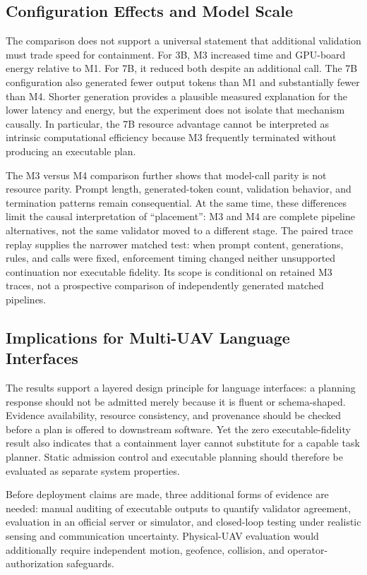 \documentclass[conference]{IEEEtran}
\newcommand{\Mone}{\textsc{M1}\xspace}
\newcommand{\Mthree}{\textsc{M3}\xspace}
\newcommand{\Mfour}{\textsc{M4}\xspace}
\begin{document}
\subsection{Configuration Effects and Model Scale}

The comparison does not support a universal statement that additional
validation must trade speed for containment. For 3B, \Mthree increased time
and GPU-board energy relative to \Mone. For 7B, it reduced both despite an
additional call. The 7B configuration also generated fewer output tokens than
\Mone and substantially fewer than \Mfour. Shorter generation provides a
plausible measured explanation for the lower latency and energy, but the
experiment does not isolate that mechanism causally. In particular, the 7B
resource advantage cannot be interpreted as intrinsic computational
efficiency because \Mthree frequently terminated without producing an
executable plan.

The \Mthree{} versus \Mfour comparison further shows that model-call parity is
not resource parity. Prompt length, generated-token count, validation behavior,
and termination patterns remain consequential. At the same time, these
differences limit the causal interpretation of ``placement'': \Mthree and
\Mfour are complete pipeline alternatives, not the same validator moved to a
 different stage. The paired trace replay supplies the narrower matched test:
 when prompt content, generations, rules, and calls were fixed, enforcement
 timing changed neither unsupported continuation nor executable fidelity. Its
 scope is conditional on retained \Mthree traces, not a prospective comparison
 of independently generated matched pipelines.

\subsection{Implications for Multi-UAV Language Interfaces}

The results support a layered design principle for language interfaces: a
planning response should not be admitted merely because it is fluent or
schema-shaped. Evidence availability, resource consistency, and provenance
should be checked before a plan is offered to downstream software. Yet the
zero executable-fidelity result also indicates that a containment layer cannot
substitute for a capable task planner. Static admission control and executable
planning should therefore be evaluated as separate system properties.

Before deployment claims are made, three additional forms of evidence are
needed: manual auditing of executable outputs to quantify validator agreement,
evaluation in an official server or simulator, and closed-loop testing under
realistic sensing and communication uncertainty. Physical-UAV evaluation
would additionally require independent motion, geofence, collision, and
operator-authorization safeguards.
\end{document}
